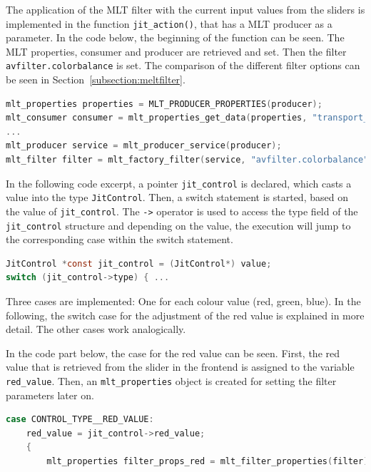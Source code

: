 \documentclass[../MasterThesis.tex]{subfiles}
\begin{document}
The application of the MLT filter with the current input values from the sliders is implemented in the function \texttt{jit\_action()}, that has a MLT producer as a parameter. In the code below, the beginning of the function can be seen. The MLT properties, consumer and producer are retrieved and set. Then the filter \texttt{avfilter.colorbalance} is set. The comparison of the different filter options can be seen in Section~\ref{subsection:meltfilter}.


\begin{lstlisting}[language=c, numbers=none, columns=fullflexible]	
mlt_properties properties = MLT_PRODUCER_PROPERTIES(producer);
mlt_consumer consumer = mlt_properties_get_data(properties, "transport_consumer", NULL);
...	
mlt_producer service = mlt_producer_service(producer);
mlt_filter filter = mlt_factory_filter(service, "avfilter.colorbalance", NULL);	
\end{lstlisting}


In the following code excerpt, a pointer \texttt{jit\_control} is declared, which casts a value into the type \texttt{JitControl}.
Then, a switch statement is started, based on the value of \texttt{jit\_control}.
The \texttt{->} operator is used to access the type field of the \texttt{jit\_control} structure and depending on the value, the execution will jump to the corresponding case within the switch statement.

\begin{lstlisting}[language=c, numbers=none, columns=fullflexible]		
JitControl *const jit_control = (JitControl*) value;
switch (jit_control->type) { ...
\end{lstlisting}

Three cases are implemented: One for each colour value (red, green, blue). In the following, the switch case for the adjustment of the red value is explained in more detail. The other cases work analogically.

In the code part below, the case for the red value can be seen. First, the red value that is retrieved from the slider in the frontend is assigned to the variable \texttt{red\_value}. Then, an \texttt{mlt\_properties} object is created for setting the filter parameters later on. 

\begin{lstlisting}[language=c, numbers=none, columns=fullflexible]			
case CONTROL_TYPE__RED_VALUE:
	red_value = jit_control->red_value;
	{
		mlt_properties filter_props_red = mlt_filter_properties(filter);
\end{lstlisting}
\end{document}
